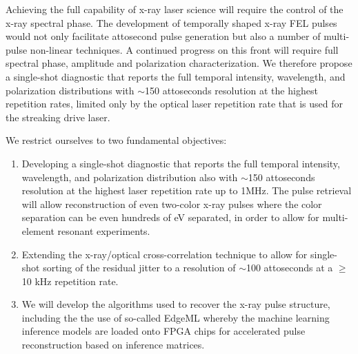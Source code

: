 Achieving the full capability of x-ray laser science will require the control of the x-ray spectral phase.
The development of temporally shaped x-ray FEL pulses would not only facilitate attosecond pulse generation but also a number of multi-pulse non-linear techniques.
A continued progress on this front \cite{Lutman13_twocolor,Marinelli13_twocolor,Allaria2014,Marinelli2015,Prince2016,Lutman2016,Marinelli2016} will require full spectral phase, amplitude and polarization characterization. 
We therefore propose a single-shot diagnostic that reports the full temporal intensity, wavelength, and polarization distributions with $\sim$150 attoseconds resolution at the highest repetition rates, limited only by the optical laser repetition rate that is used for the streaking drive laser.

We restrict ourselves to two fundamental objectives:
\begin{enumerate}
\item \label{obj::streaking} Developing a single-shot diagnostic that reports the full temporal intensity, wavelength, and polarization distribution also with $\sim$150 attoseconds resolution at the highest laser repetition rate up to 1MHz.  
The pulse retrieval will allow reconstruction of even two-color x-ray pulses where the color separation can be even hundreds of eV separated, in order to allow for multi-element resonant experiments.
\item \label{obj::euv-xray} Extending the x-ray/optical cross-correlation technique to allow for single-shot sorting of the residual jitter to a resolution of $\sim$100 attoseconds at a $\geq$10 kHz repetition rate.
\item \label{obj::ml} We will develop the algorithms used to recover the x-ray pulse structure, including the the use of so-called EdgeML whereby the machine learning inference models are loaded onto FPGA chips for accelerated pulse reconstruction based on inference matrices.
\end{enumerate}
